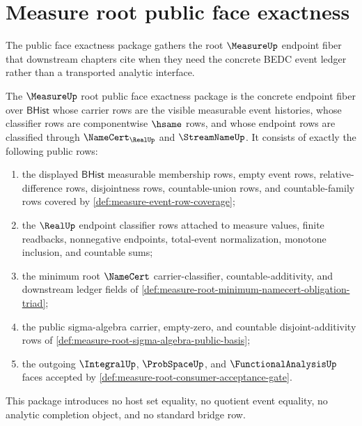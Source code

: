 \section{Measure root public face exactness}
\label{sec:measure-root-public-face-exactness}

The public face exactness package gathers the root $\MeasureUp$ endpoint
fiber that downstream chapters cite when they need the concrete BEDC event
ledger rather than a transported analytic interface.

\begin{definition}
\label{def:measure-root-public-face-exactness}
The $\MeasureUp$ root public face exactness package is the concrete endpoint
fiber over $\mathsf{BHist}$ whose carrier rows are the visible measurable
event histories, whose classifier rows are componentwise $\hsame$ rows, and
whose endpoint rows are classified through $\NameCert_{\RealUp}$ and
$\StreamNameUp$. It consists of exactly the following public rows:
\begin{enumerate}
  \item the displayed $\mathsf{BHist}$ measurable membership rows, empty
  event rows, relative-difference rows, disjointness rows, countable-union
  rows, and countable-family rows covered by
  \autoref{def:measure-event-row-coverage};
  \item the $\RealUp$ endpoint classifier rows attached to measure values,
  finite readbacks, nonnegative endpoints, total-event normalization,
  monotone inclusion, and countable sums;
  \item the minimum root $\NameCert$ carrier-classifier, countable-additivity,
  and downstream ledger fields of
  \autoref{def:measure-root-minimum-namecert-obligation-triad};
  \item the public sigma-algebra carrier, empty-zero, and countable
  disjoint-additivity rows of
  \autoref{def:measure-root-sigma-algebra-public-basis};
  \item the outgoing $\IntegralUp$, $\ProbSpaceUp$, and
  $\FunctionalAnalysisUp$ faces accepted by
  \autoref{def:measure-root-consumer-acceptance-gate}.
\end{enumerate}
This package introduces no host set equality, no quotient event equality, no
analytic completion object, and no standard bridge row.
\end{definition}

